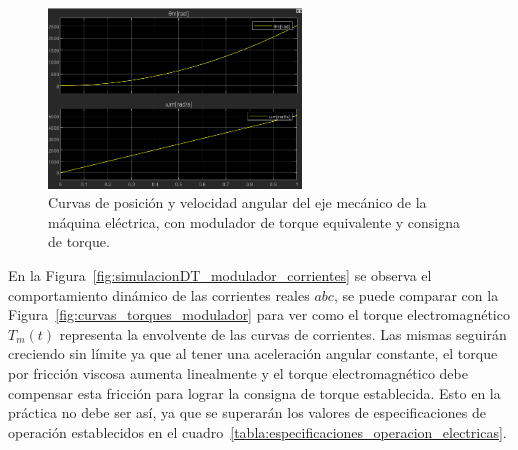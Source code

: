 \documentclass{article}
\begin{document}
\begin{figure}[H]
    \centering
    \includegraphics[width=0.6\textwidth]{Imagenes/Curvas_posicion_velocidad_modular_torque.png}
    \caption{Curvas de posición y velocidad angular del eje mecánico de la máquina eléctrica, con modulador de torque equivalente y consigna de torque.}
    \label{fig:curvas_posicion_velocidad_modulador_torque}
\end{figure}

En la Figura~\ref{fig:simulacionDT_modulador_corrientes} se observa el comportamiento dinámico de las corrientes reales \(abc\), se puede comparar con la Figura~\ref{fig:curvas_torques_modulador} para ver como el torque electromagnético \(T_m(t)\) representa la envolvente de las curvas de corrientes. Las mismas seguirán creciendo sin límite ya que al tener una aceleración angular constante, el torque por fricción viscosa aumenta linealmente y el torque electromagnético debe compensar esta fricción para lograr la consigna de torque establecida. Esto en la práctica no debe ser así, ya que se superarán los valores de especificaciones de operación establecidos en el cuadro~\ref{tabla:especificaciones_operacion_electricas}.
\end{document}
